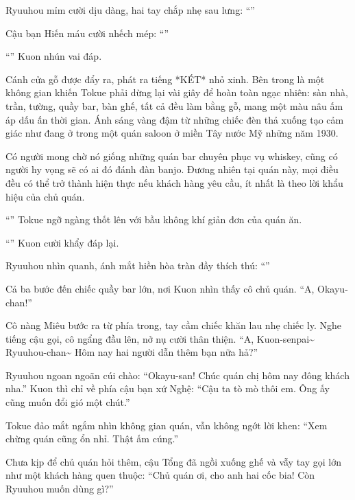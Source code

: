\documentclass[../main.tex]{subfiles}
\begin{document}
Ryuuhou mỉm cười dịu dàng, hai tay chắp nhẹ sau lưng: ``''

Cậu bạn Hiến máu cười nhếch mép: ``''

``'' Kuon nhún vai đáp.

Cánh cửa gỗ được đẩy ra, phát ra tiếng *KÉT* nhỏ xinh. Bên trong là một không gian khiến Tokue phải dừng lại vài giây để hoàn toàn ngạc nhiên: sàn nhà, trần, tường, quầy bar, bàn ghế, tất cả đều làm bằng gỗ, mang một màu nâu ấm áp dấu ấn thời gian. Ánh sáng vàng đậm từ những chiếc đèn thả xuống tạo cảm giác như đang ở trong một quán saloon ở miền Tây nước Mỹ những năm 1930.


Có người mong chờ nó giống những quán bar chuyên phục vụ whiskey, cũng có người hy vọng sẽ có ai đó đánh đàn banjo. Đương nhiên tại quán này, mọi điều đều có thể trở thành hiện thực nếu khách hàng yêu cầu, ít nhất là theo lời khẩu hiệu của chủ quán.

``'' Tokue ngỡ ngàng thốt lên với bầu không khí giản đơn của quán ăn.

``'' Kuon cười khẩy đáp lại.

Ryuuhou nhìn quanh, ánh mắt hiền hòa tràn đầy thích thú: ``''

Cả ba bước đến chiếc quầy bar lớn, nơi Kuon nhìn thấy cô chủ quán. ``A, Okayu-chan!''

Cô nàng Miêu bước ra từ phía trong, tay cầm chiếc khăn lau nhẹ chiếc ly. Nghe tiếng cậu gọi, cô ngẩng đầu lên, nở nụ cười thân thiện. ``A, Kuon-senpai\~{} Ryuuhou-chan\~{} Hôm nay hai người dẫn thêm bạn nữa hả?''

Ryuuhou ngoan ngoãn cúi chào: ``Okayu-san! Chúc quán chị hôm nay đông khách nha.'' Kuon thì chỉ về phía cậu bạn xứ Nghệ: ``Cậu ta tò mò thôi em. Ông ấy cũng muốn đổi gió một chút.''

Tokue đảo mắt ngắm nhìn không gian quán, vẫn không ngớt lời khen: ``Xem chừng quán cũng ổn nhỉ. Thật ấm cúng.''

Chưa kịp để chủ quán hỏi thêm, cậu Tổng đã ngồi xuống ghế và vẫy tay gọi lớn như một khách hàng quen thuộc: ``Chủ quán ơi, cho anh hai cốc bia! Còn Ryuuhou muốn dùng gì?''
\end{document}
